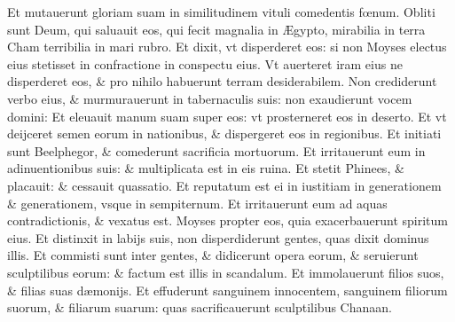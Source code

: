\documentclass[a5paper,10pt]{book}
\def\ae{æ}
\def\AE{Æ}
\def\oe{œ}
\begin{document}
\begin{multicols*}{2}
\newline \color{red} E\color{black}t mutauerunt gloriam suam in similitudinem vituli comedentis f\oe num.
\newline \color{red} O\color{black}bliti sunt Deum, qui saluauit eos, qui fecit magnalia in \AE gypto, mirabilia in terra Cham terribilia in mari rubro.
\newline \color{red} E\color{black}t dixit, vt disperderet eos: si non Moyses electus eius stetisset in confractione in conspectu eius.
\newline \color{red} V\color{black}t auerteret iram eius ne disperderet eos, \& pro nihilo habuerunt terram desiderabilem.
\newline \color{red} N\color{black}on crediderunt verbo eius, \& murmurauerunt in tabernaculis suis: non exaudierunt vocem domini:
\newline \color{red} E\color{black}t eleuauit manum suam super eos: vt prosterneret eos in deserto.
\newline \color{red} E\color{black}t vt deijceret semen eorum in nationibus, \& dispergeret eos in regionibus.
\newline \color{red} E\color{black}t initiati sunt Beelphegor, \& comederunt sacrificia mortuorum.
\newline \color{red} E\color{black}t irritauerunt eum in adinuentionibus suis: \& multiplicata est in eis ruina.
\newline \color{red} E\color{black}t stetit Phinees, \& placauit: \& cessauit quassatio.
\newline \color{red} E\color{black}t reputatum est ei in iustitiam in generationem \& generationem, vsque in sempiternum.
\newline \color{red} E\color{black}t irritauerunt eum ad aquas contradictionis, \& vexatus est.
\newline \color{red} M\color{black}oyses propter eos, quia exacerbauerunt spiritum eius.
\newline \color{red} E\color{black}t distinxit in labijs suis, non disperdiderunt gentes, quas dixit dominus illis.
\newline \color{red} E\color{black}t commisti sunt inter gentes, \& didicerunt opera eorum, \& seruierunt sculptilibus eorum: \& factum est illis in scandalum.
\newline \color{red} E\color{black}t immolauerunt filios suos, \& filias suas d\ae monijs.
\newline \color{red} E\color{black}t effuderunt sanguinem innocentem, sanguinem filiorum suorum, \& filiarum suarum: quas sacrificauerunt sculptilibus Chanaan.

\end{multicols*}
\end{document}
